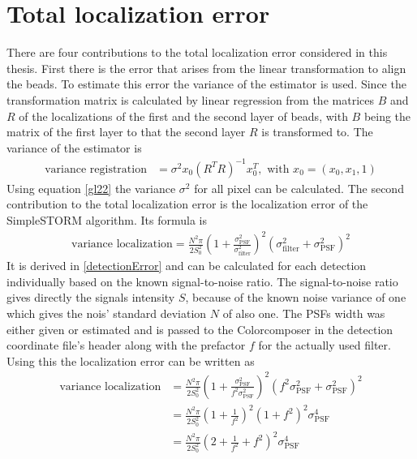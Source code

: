\section{Total localization error}
There are four contributions to the total localization error considered in this thesis.\newline
First there is the error that arises from the linear transformation to align the beads. To estimate this error the variance of the estimator is used. Since the transformation matrix is calculated by linear regression from the matrices $B$ and $R$ of the localizations of the first and the second layer of beads, with $B$ being the matrix of the first layer to that the second layer $R$ is transformed to. The variance of the estimator is
\begin{align}
\text{variance registration}&= \sigma^2 x_0\left(R^TR\right)^{-1}x_0^T, \text{ with }x_0 = \left(x_0,x_1,1\right) \label{gl22}
\end{align}
Using equation \ref{gl22} the variance $\sigma^2$ for all pixel can be calculated.\newline
The second contribution to the total localization error is the localization error of the SimpleSTORM algorithm. Its formula is
\begin{align}
 \text{variance localization} = \frac{N^2\pi}{2S_0^2} \left(1+\frac{\sigma_\text{PSF}^2}{\sigma_\text{filter}^2}\right)^2\left(\sigma_\text{filter}^2+\sigma_\text{PSF}^2\right)^2
\end{align}
It is derived in \ref{detectionError} and can be calculated for each detection individually based on the known signal-to-noise ratio. The signal-to-noise ratio gives directly the signals intensity $S$, because of the known noise variance of one which gives the nois' standard deviation $N$ of also one. The PSFs width was either given or estimated and is passed to the Colorcomposer in the detection coordinate file's header along with the prefactor $f$ for the actually used filter. Using this the localization error can be written as
\begin{align}
 \text{variance localization} &= \frac{N^2\pi}{2S_0^2} \left(1+\frac{\sigma_\text{PSF}^2}{f^2\sigma_\text{PSF}^2}\right)^2\left(f^2\sigma_\text{PSF}^2+\sigma_\text{PSF}^2\right)^2 \\
 &=\frac{N^2\pi}{2S_0^2}\left(1+\frac{1}{f^2}\right)^2\left(1+f^2\right)^2\sigma_\text{PSF}^4\\
 &= \frac{N^2\pi}{2S_0^2}\left(2+\frac{1}{f^2}+f^2\right)^2\sigma_\text{PSF}^4
\end{align}
